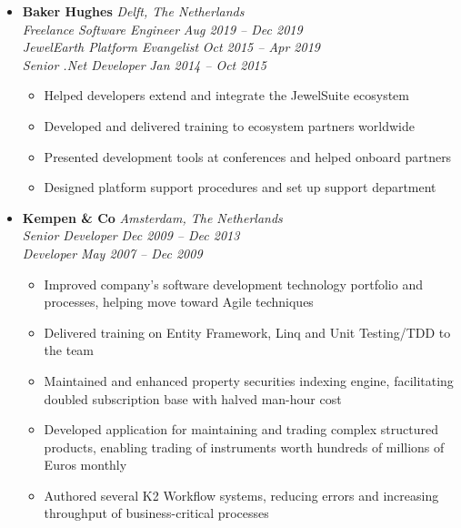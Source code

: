 \documentclass[11pt,a4paper]{article}
\begin{document}
\begin{itemize}[leftmargin=0pt,label={},itemsep=2em]
\item \textbf{Baker Hughes} \hfill \textit{Delft, The Netherlands}\\[2pt]
\textit{Freelance Software Engineer} \hfill \textit{Aug 2019 -- Dec 2019}\\[2pt]
\textit{JewelEarth Platform Evangelist} \hfill \textit{Oct 2015 -- Apr 2019}\\[2pt]
\textit{Senior .Net Developer} \hfill \textit{Jan 2014 -- Oct 2015}\\[1pt]
\begin{itemize}[leftmargin=*,topsep=0pt,parsep=0pt,partopsep=0pt]
    \item Helped developers extend and integrate the JewelSuite ecosystem
    \item Developed and delivered training to ecosystem partners worldwide
    \item Presented development tools at conferences and helped onboard partners
    \item Designed platform support procedures and set up support department
\end{itemize}

\item \textbf{Kempen \& Co} \hfill \textit{Amsterdam, The Netherlands}\\[2pt]
\textit{Senior Developer} \hfill \textit{Dec 2009 -- Dec 2013}\\[2pt]
\textit{Developer} \hfill \textit{May 2007 -- Dec 2009}\\[1pt]
\begin{itemize}[leftmargin=*,topsep=0pt,parsep=0pt,partopsep=0pt]
    \item Improved company's software development technology portfolio and processes, helping move toward Agile techniques
    \item Delivered training on Entity Framework, Linq and Unit Testing/TDD to the team
    \item Maintained and enhanced property securities indexing engine, facilitating doubled subscription base with halved man-hour cost
    \item Developed application for maintaining and trading complex structured products, enabling trading of instruments worth hundreds of millions of Euros monthly
    \item Authored several K2 Workflow systems, reducing errors and increasing throughput of business-critical processes
\end{itemize}


\end{itemize}
\end{document}
